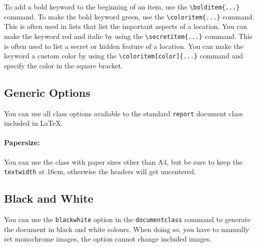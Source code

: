\documentclass[
]{dragonbane-supplement}
\begin{document}
\begin{segment}[Segments]
\begin{itemize}
     To add a bold keyword to the beginning of an item, use the \texttt{\textbackslash bolditem\{...\}} command.
     To make the bold keyword green, use the \texttt{\textbackslash coloritem\{...\}} command. This is often used in lists that list the important aspects of a location.
     You can make the keyword red and italic by using the \texttt{\textbackslash secretitem\{...\}} command. This is often used to list a secret or hidden feature of a location.
      You can make the keyword a custom color by using the \texttt{\textbackslash coloritem[color]\{...\}} command and specify the color in the square bracket.
\end{itemize}
\end{segment}



\begin{segment}
\subsection{Generic Options}
You can use all class options available to the standard \texttt{report} document class included in LaTeX.

\paragraph{Papersize:} You can use the class with paper sizes other than A4, but be sure to keep the \texttt{textwidth} at 16cm, otherwise the headers will get uncentered.

\subsection{Black and White}
You can use the \texttt{blackwhite} option in the \texttt{documentclass} command to generate the document in black and white colours. When doing so, you have to manually set monochrome images, the option cannot change included images.
\end{segment}

\end{document}
